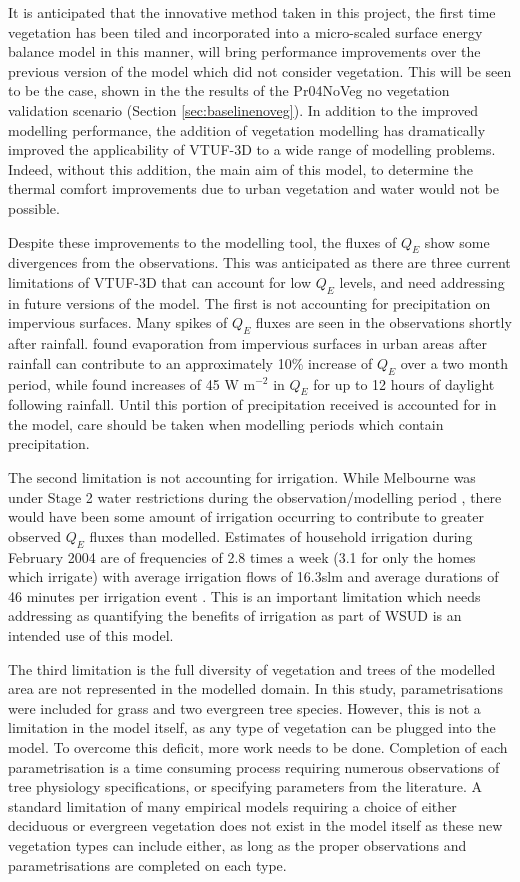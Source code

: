 \documentclass[final,3p,times,authoryear]{elsarticle}
\begin{document}
It is anticipated that the innovative method taken in this project, the first time vegetation has been tiled and incorporated into a micro-scaled surface energy balance model in this manner, will bring performance improvements over the previous version of the model which did not consider vegetation. This will be seen to be the case, shown in the the results of the Pr04NoVeg no vegetation validation scenario (Section \ref{sec:baselinenoveg}). In addition to the improved modelling performance, the addition of vegetation modelling has dramatically improved the applicability of VTUF-3D to a wide range of modelling problems. Indeed, without this addition, the main aim of this model, to determine the thermal comfort improvements due to urban vegetation and water would not be possible. 

Despite these improvements to the modelling tool, the fluxes of $Q_{E}$ show some divergences from the observations. This was anticipated as there are three current limitations of VTUF-3D that can account for low $Q_{E}$ levels, and need addressing in future versions of the model. The first is not accounting for precipitation on impervious surfaces. Many spikes of $Q_{E}$ fluxes are seen in the observations shortly after rainfall. \cite{Demuzere2014} found evaporation from impervious surfaces in urban areas after rainfall can contribute to an approximately 10\% increase of $Q_{E}$ over a two month period, while \cite{Wouters2013} found increases of 45 W m$^{-2}$ in $Q_{E}$ for up to 12 hours of daylight following rainfall. Until this portion of precipitation received is accounted for in the model, care should be taken when modelling periods which contain precipitation.

The second limitation is not accounting for irrigation. While Melbourne was under Stage 2 water restrictions during the observation/modelling period \citep{MelbourneWater2016a}, there would have been some amount of irrigation occurring to contribute to greater observed $Q_{E}$ fluxes than modelled. Estimates of household irrigation during February 2004 are of frequencies of 2.8 times a week (3.1 for only the homes which irrigate) with average irrigation flows of 16.3slm and average durations of 46 minutes per irrigation event \citep{Roberts2005}. This is an important limitation which needs addressing as quantifying the benefits of irrigation as part of WSUD is an intended use of this model. 

The third limitation is the full diversity of vegetation and trees of the modelled area are not represented in the modelled domain. In this study, parametrisations were included for grass and two evergreen tree species. However, this is not a limitation in the model itself, as any type of vegetation can be plugged into the model. To overcome this deficit, more work needs to be done. Completion of each parametrisation is a time consuming process requiring numerous observations of tree physiology specifications, or specifying parameters from the literature. A standard limitation of many empirical models requiring a choice of either deciduous or evergreen vegetation does not exist in the model itself as these new vegetation types can include either, as long as the proper observations and parametrisations are completed on each type.
\end{document}
